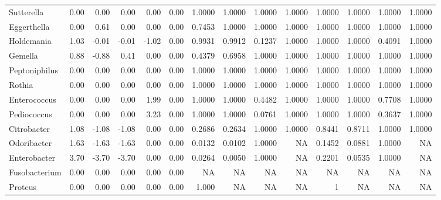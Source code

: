 {\begin{landscape}
\begin{longtable}{ | l | r | r | r | r | r | r  | r | r | r | r | r | r  | r  |}
		Sutterella & 0.00 & 0.00 & 0.00 & 0.00 & 0.00 & 1.0000 & 1.0000 & 1.0000 & 1.0000 & 1.0000 & 1.0000 & 1.0000 & 1.0000 \\ 
		Eggerthella & 0.00 & 0.61 & 0.00 & 0.00 & 0.00 & 0.7453 & 1.0000 & 1.0000 & 1.0000 & 1.0000 & 1.0000 & 1.0000 & 1.0000 \\ 
		Holdemania & 1.03 & -0.01 & -0.01 & -1.02 & 0.00 & 0.9931 & 0.9912 & 0.1237 & 1.0000 & 1.0000 & 1.0000 & 0.4091 & 1.0000 \\ 
		Gemella & 0.88 & -0.88 & 0.41 & 0.00 & 0.00 & 0.4379 & 0.6958 & 1.0000 & 1.0000 & 1.0000 & 1.0000 & 1.0000 & 1.0000 \\ 
		Peptoniphilus & 0.00 & 0.00 & 0.00 & 0.00 & 0.00 & 1.0000 & 1.0000 & 1.0000 & 1.0000 & 1.0000 & 1.0000 & 1.0000 & 1.0000 \\ 
		Rothia & 0.00 & 0.00 & 0.00 & 0.00 & 0.00 & 1.0000 & 1.0000 & 1.0000 & 1.0000 & 1.0000 & 1.0000 & 1.0000 & 1.0000 \\ 
		Enterococcus & 0.00 & 0.00 & 0.00 & 1.99 & 0.00 & 1.0000 & 1.0000 & 0.4482 & 1.0000 & 1.0000 & 1.0000 & 0.7708 & 1.0000 \\ 
		Pediococcus & 0.00 & 0.00 & 0.00 & 3.23 & 0.00 & 1.0000 & 1.0000 & 0.0761 & 1.0000 & 1.0000 & 1.0000 & 0.3637 & 1.0000 \\ 
		Citrobacter & 1.08 & -1.08 & -1.08 & 0.00 & 0.00 & 0.2686 & 0.2634 & 1.0000 & 1.0000 & 0.8441 & 0.8711 & 1.0000 & 1.0000 \\ 
		Odoribacter & 1.63 & -1.63 & -1.63 & 0.00 & 0.00 & 0.0132 & 0.0102 & 1.0000 & NA & 0.1452 & 0.0881 & 1.0000 & NA \\ 
		Enterobacter & 3.70 & -3.70 & -3.70 & 0.00 & 0.00 & 0.0264 & 0.0050 & 1.0000 & NA & 0.2201 & 0.0535 & 1.0000 & NA \\ 
		Fusobacterium & 0.00 & 0.00 & 0.00 & 0.00 & 0.00 & NA & NA & NA & NA & NA & NA & NA & NA \\ 
		Proteus & 0.00 & 0.00 & 0.00 & 0.00 & 0.00 & 1.000 & NA & NA & NA & 1 & NA & NA & NA
		
	\end{longtable}
	\end{landscape}
}







